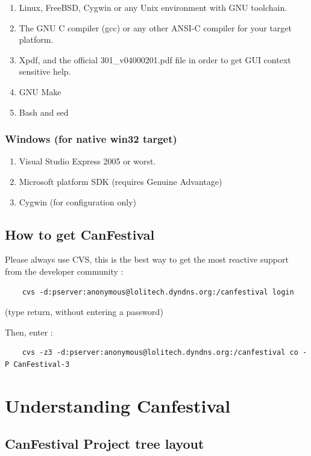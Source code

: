 \documentclass[12pt,english,a4paper]{book}
\begin{document}
\begin{enumerate}
\item Linux, FreeBSD, Cygwin or any Unix environment with GNU toolchain. 
\item The GNU C compiler (gcc) or any other ANSI-C compiler for your target
platform. 
\item Xpdf, and the official 301\_v04000201.pdf file in order to get GUI
context sensitive help. 
\item GNU Make 
\item Bash and sed 
\end{enumerate}

\subsubsection{Windows (for native win32 target)}

\begin{enumerate}
\item Visual Studio Express 2005 or worst. 
\item Microsoft platform SDK (requires Genuine Advantage) 
\item Cygwin (for configuration only) 
\end{enumerate}

\subsection{How to get CanFestival}

Please always use CVS, this is the best way to get the most reactive
support from the developer community :


\begin{verbatim}
	cvs -d:pserver:anonymous@lolitech.dyndns.org:/canfestival login
\end{verbatim}

(type return, without entering a password)

Then, enter :

\begin{verbatim}
	cvs -z3 -d:pserver:anonymous@lolitech.dyndns.org:/canfestival co -P CanFestival-3
\end{verbatim}



\section{Understanding Canfestival}

\subsection{CanFestival Project tree layout}
\end{document}
